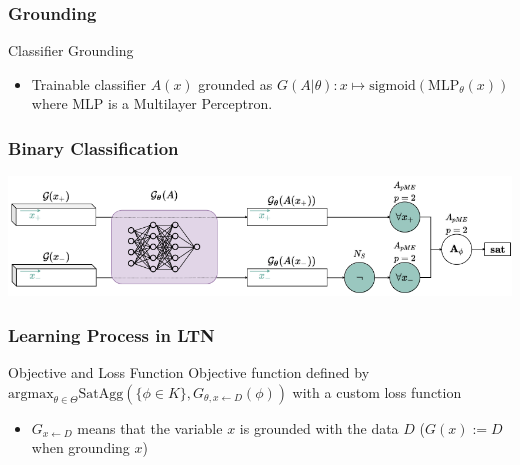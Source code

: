 \documentclass{beamer}
\begin{document}
\begin{frame}
  \frametitle{Grounding}
  \begin{block}{Classifier Grounding}
    \begin{itemize}
    \item Trainable classifier \( A(x) \) grounded as \( G(A |
      \theta): x \mapsto \text{sigmoid}(\text{MLP}_\theta(x)) \)
      where MLP is a Multilayer Perceptron.
    \end{itemize}
  \end{block}
\end{frame}

\begin{frame}
  \frametitle{Binary Classification}
  \includegraphics[width=\textwidth]{ex1.png}
\end{frame}


\begin{frame}
  \frametitle{Learning Process in LTN}
  \begin{block}{Objective and Loss Function}
    Objective function defined by
    \( \text{argmax}_{\theta \in \Theta} \text{SatAgg}(\{\phi \in K\},
    G_{\theta, x \leftarrow D}(\phi)) \) with a custom loss function
    \begin{itemize}
    \item $G_{x \leftarrow D}$ means that the variable $x$ is grounded
      with the data $D$ ($G(x) := D$ when grounding $x$)
    \end{itemize}
  \end{block}
\end{frame}
\end{document}
